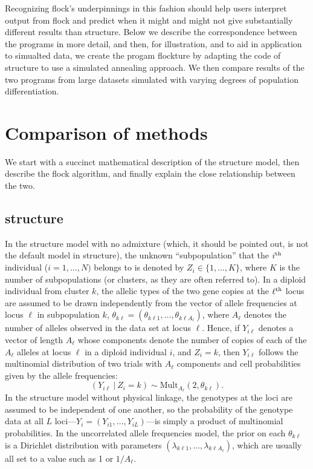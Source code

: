 Recognizing {\sc flock}'s underpinnings in this fashion should help users
interpret output from {\sc flock} and predict when it might and might not
give substantially different results than {\sc structure}. Below we describe
the correspondence between the programs in more detail, and then, for illustration,
and to aid in application to simualted data, we
create the progam {\sc flockture} by adapting the code of {\sc structure} to 
use a simulated annealing approach. We then compare results of the two
programs from large 
datasets simulated with varying degrees of population differentiation. 

\section*{Comparison of methods}
We start with a succinct mathematical description of the {\sc structure}
model, then describe the {\sc flock} algorithm, and finally explain
the close relationship between the two.


\subsection*{{\sc structure}}
In the {\sc structure} model with no admixture (which, it should be pointed out, 
is not the default model in {\sc structure}), the unknown ``subpopulation'' that the 
$i^\mathrm{th}$ individual ($i=1,\ldots,N)$ belongs to is denoted by $Z_i \in \{1,\ldots,K\}$, 
where $K$ is the 
number of subpopulations (or clusters, as they are often referred to).  
In a diploid individual from cluster $k$, the 
allelic types of the two gene copies at the $\ell^\mathrm{th}$ locus are assumed
to be drawn independently from the vector of allele frequencies at
locus $\ell$ in subpopulation $k$,  $\theta_{k\ell}=(\theta_{k\ell 1},\ldots,\theta_{k\ell A_\ell})$, where 
$A_\ell$ 
denotes the number of alleles observed in the data set at locus $\ell$.
Hence, if $Y_{i\ell}$ denotes a vector of length $A_\ell$ whose components denote the 
number
of copies of each of the $A_\ell$ alleles at locus $\ell$ in a diploid individual $i$, and 
$Z_i=k$, then $Y_{i\ell}$ follows the multinomial distribution of two trials with
$A_\ell$  components and cell probabilities given by the allele frequencies: 
\begin{equation}
(Y_{i\ell}~|~Z_i=k) \sim \mathrm{Mult}_{A_\ell}(2, \theta_{k\ell}).
\end{equation}
In the {\sc structure} model without physical linkage, the genotypes at the loci are assumed to
be independent of one another, so the probability of the genotype data at
all $L$ loci---$Y_i=(Y_{i1},\ldots,Y_{iL})$---is simply a product of multinomial 
probabilities.
In the uncorrelated allele frequencies model, the prior on each $\theta_{k\ell}$ is a
Dirichlet distribution with parameters $(\lambda_{k\ell1},\ldots,\lambda_{k\ell A_
\ell})$,
which are usually all set to a value such as 1 or $1/A_\ell$.  


